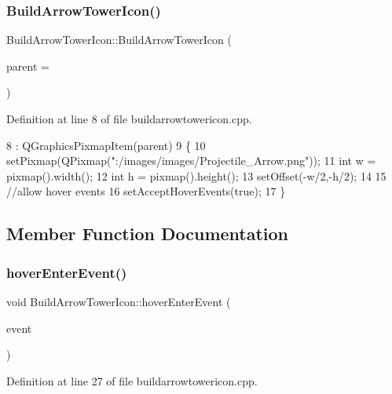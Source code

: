 \subsubsection{\texorpdfstring{Build\+Arrow\+Tower\+Icon()}{BuildArrowTowerIcon()}}
{\footnotesize\ttfamily Build\+Arrow\+Tower\+Icon\+::\+Build\+Arrow\+Tower\+Icon (\begin{DoxyParamCaption}\item[{Q\+Graphics\+Item $\ast$}]{parent = {} }\end{DoxyParamCaption})}



Definition at line 8 of file buildarrowtowericon.\+cpp.


\begin{DoxyCode}
8                                                              : QGraphicsPixmapItem(parent)
9 \{
10     setPixmap(QPixmap(\textcolor{stringliteral}{":/images/images/Projectile\_Arrow.png"}));
11     \textcolor{keywordtype}{int} w = pixmap().width();
12     \textcolor{keywordtype}{int} h = pixmap().height();
13     setOffset(-w/2,-h/2);
14 
15     \textcolor{comment}{//allow hover events}
16     setAcceptHoverEvents(\textcolor{keyword}{true});
17 \}
\end{DoxyCode}


\subsection{Member Function Documentation}
\mbox{\label{class_build_arrow_tower_icon_aad1a1a9846e6ccf27ca2becce40ce152}} 
\subsubsection{\texorpdfstring{hover\+Enter\+Event()}{hoverEnterEvent()}}
{\footnotesize\ttfamily void Build\+Arrow\+Tower\+Icon\+::hover\+Enter\+Event (\begin{DoxyParamCaption}\item[{Q\+Graphics\+Scene\+Mouse\+Event $\ast$}]{event }\end{DoxyParamCaption})}



Definition at line 27 of file buildarrowtowericon.\+cpp.


